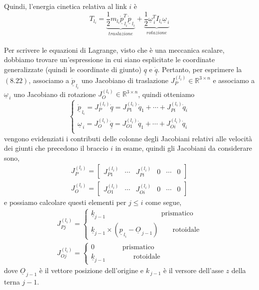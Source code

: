 Quindi, l'energia cinetica relativa al link $i$ è
\begin{equation}
	T_{l_i} = \underbrace{\frac{1}{2} m_{l_i} \underline{\dot{p}}_{\,l_i}^T \underline{\dot{p}}_{\,l_i}}_{traslazione} + \underbrace{\frac{1}{2} \underline{\omega}_{\,i}^T I_{l_i} \underline{\omega}_{\,i}}_{rotazione}
\end{equation}

\paragraph{}
Per scrivere le equazioni di Lagrange, visto che è una meccanica scalare, dobbiamo trovare un'espressione in cui siano esplicitate le coordinate generalizzate (quindi le coordinate di giunto) $\underline{q}$ e $\dot{\underline{q}}$. Pertanto, per esprimere la $(8.22)$, associamo a $\dot{\underline{p}}_{\,l_i}$ uno Jacobiano di traslazione $J_P^{(l_i)} \in \mathbb{R}^{3 \times n}$ e associamo a $\underline{\omega}_{\,i}$ uno Jacobiano di rotazione $J_O^{(l_i)} \in \mathbb{R}^{3 \times n}$, quindi otteniamo
\begin{equation}
	\begin{cases}
		\dot{\underline{p}}_{\,l_i} = J_P^{(l_i)} \underline{\dot{q}} = J_{P1}^{(l_i)} \dot{q}_1 + \cdots + J_{Pi}^{(l_i)} \dot{q}_i \\
		\underline{\omega}_{\,i} = J_O^{(l_i)} \underline{\dot{q}} = J_{O1}^{(l_i)} \dot{q}_1 + \cdots + J_{Oi}^{(l_i)} \dot{q}_i \\
	\end{cases}
\end{equation}
vengono evidenziati i contributi delle colonne degli Jacobiani relativi alle velocità dei giunti che precedono il braccio $i$ in esame, quindi gli Jacobiani da considerare sono, 
\begin{align}
	J_P^{(l_i)} = 
	\begin{bmatrix}
		J_{P1}^{(l_i)} & \cdots & J_{Pi}^{(l_i)} & 0 & \cdots & 0
	\end{bmatrix} \\
	J_O^{(l_i)} = 
	\begin{bmatrix}
		J_{O1}^{(l_i)} & \cdots & J_{Oi}^{(l_i)} & 0 & \cdots & 0
	\end{bmatrix} 
\end{align} 
e possiamo calcolare questi elementi per $j \leq i$ come segue,
\begin{align}
	J_{Pj}^{(l_i)} =
	\begin{cases}
		\underline{k}_{j-1} \qquad\qquad \qquad\qquad \text{prismatico} \\
		\underline{k}_{j-1} \times (\underline{p}_{\,l_i} - \underline{O}_{\,j-1}) \qquad \text{rotoidale}
	\end{cases}\\
	J_{Oj}^{(l_i)} = 
	\begin{cases}
		0 \qquad\qquad  \text{prismatico} \\
		\underline{k}_{j-1} \qquad\qquad \text{rotoidale}
	\end{cases}
\end{align}
dove $\underline{O}_{\,j-1}$ è il vettore posizione dell'origine e $k_{\,j-1}$ è il versore dell'asse $z$ della terna $j-1$.

